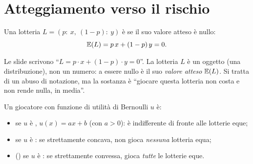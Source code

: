 \section{Atteggiamento verso il rischio}

\begin{definizione}
Una lotteria $L = (p{:}\ x,\ (1-p){:}\ y)$ è  se il suo valore atteso è nullo:
\[
  \mathbb{E}(L) = p\,x + (1-p)\,y = 0 .
\]
\end{definizione}

\begin{attenzione}
Le slide scrivono ``$L = p \cdot x + (1-p)\cdot y = 0$''. La lotteria $L$ è un oggetto
(una distribuzione), non un numero: a essere nullo è il suo \emph{valore atteso}
$\mathbb{E}(L)$. Si tratta di un abuso di notazione, ma la sostanza è ``giocare questa lotteria
non costa e non rende nulla, in media''.
\end{attenzione}

\begin{definizione}
Un giocatore con funzione di utilità di Bernoulli $u$ è:
\begin{itemize}
  \item {} se $u$ è , $u(x) = ax + b$ (con $a > 0$):
        è indifferente di fronte alle lotterie eque;
  \item {} se $u$ è :
        se strettamente concava, non gioca \emph{nessuna} lotteria equa;
  \item {} () se $u$ è :
        se strettamente convessa, gioca \emph{tutte} le lotterie eque.
\end{itemize}
\end{definizione}

